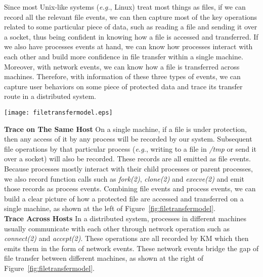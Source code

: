 \documentclass[letterpaper,twocolumn,10pt]{article}
\begin{document}
Since most Unix-like systems (\textit{e.g.}, Linux) treat most things as
files, if we can record all the relevant file events, we can then capture
most of the key operations related to some particular piece of data, such as
reading a file and sending it over a socket, thus being confident in knowing
how a file is accessed and transferred. If we also have 
processes events at hand, we can know how processes interact with each other
and build more confidence in file transfer within a single machine. Moreover,
with network events, we can know how a file is transferred across machines.
Therefore, with information of these three types of events, we can capture
user behaviors on some piece of protected data and trace its transfer route
in a distributed system.\\

\begin{figure*}
    \centering
    \texttt{[image: filetransfermodel.eps]}
    \caption{left: file access and transfer in a single machine. right: distributed system }
    \label{fig:filetransfermodel}
\end{figure*}

\noindent
\textbf{Trace on The Same Host} On a single machine, if a file is under
protection, then any access of it by any process will be recorded by our
system. Subsequent file operations by that particular process (\textit{e.g.},
writing to a file in \textit{/tmp} or send it over a socket) will also be
recorded. These records are all emitted as file events. Because processes
mostly interact with their child processes or parent processes, we also
record function calls such as \textit{fork(2)}, \textit{clone(2)} and
\textit{execve(2)} and emit those records as process events. Combining file
events and process events, we can build a clear picture of how a protected
file are accessed and transferred on a single machine, as shown at the left
of Figure~\ref{fig:filetransfermodel}.\\ 

\noindent
\textbf{Trace Across Hosts} In a distributed system, processes in different
machines usually communicate with each other through network operation such
as \textit{connect(2)} and \textit{accept(2)}. These operations are all
recorded by KM which then emits them in the form of network events. These
network events bridge the gap of file transfer between different machines, as
shown at the right of Figure~\ref{fig:filetransfermodel}.\\
\end{document}
